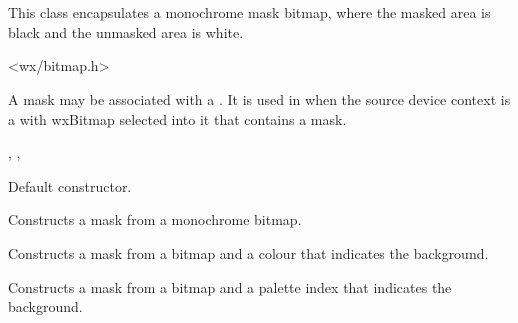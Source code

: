\section{}\label{wxmask}

This class encapsulates a monochrome mask bitmap, where the masked area is black and
the unmasked area is white.




<wx/bitmap.h>


A mask may be associated with a . It is used in  when
the source device context is a  with wxBitmap selected into it that
contains a mask.


, , 


\label{wxmaskconstr}


Default constructor.


Constructs a mask from a monochrome bitmap.


Constructs a mask from a bitmap and a colour that indicates the background.


Constructs a mask from a bitmap and a palette index that indicates the background.







